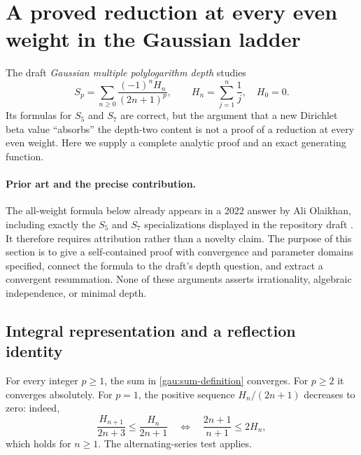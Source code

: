 \section{A proved reduction at every even weight in the Gaussian ladder}
\label{gau:section}

The draft \emph{Gaussian multiple polylogarithm depth} studies
\begin{equation}\label{gau:sum-definition}
 S_p=\sum_{n\geq 0}\frac{(-1)^nH_n}{(2n+1)^p},
 \qquad H_n=\sum_{j=1}^n\frac1j,\quad H_0=0.
\end{equation}
Its formulas for $S_5$ and $S_7$ are correct, but the argument that a new
Dirichlet beta value ``absorbs'' the depth-two content is not a proof of a
reduction at every even weight. Here we supply a complete analytic proof and
an exact generating function.

\paragraph{Prior art and the precise contribution.}
The all-weight formula below already appears in a 2022 answer by
Ali Olaikhan, including exactly the $S_5$ and $S_7$ specializations displayed
in the repository draft \cite{gau-olaikhan-2022}.
It therefore requires attribution rather than a novelty claim. The purpose
of this section is to give a self-contained proof with convergence and
parameter domains specified, connect the formula to the draft's depth
question, and extract a convergent resummation. None of these arguments
asserts irrationality, algebraic independence, or minimal depth.

\subsection{Integral representation and a reflection identity}

For every integer $p\geq1$, the sum in \eqref{gau:sum-definition} converges.
For $p\geq2$ it converges absolutely. For $p=1$, the positive sequence
$H_n/(2n+1)$ decreases to zero: indeed,
\[
 \frac{H_{n+1}}{2n+3}\leq\frac{H_n}{2n+1}
 \quad\Longleftrightarrow\quad
 \frac{2n+1}{n+1}\leq2H_n,
\]
which holds for $n\geq1$. The alternating-series test applies.

